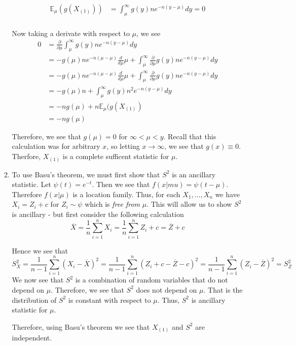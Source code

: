 \documentclass[12pt]{article}  %
\newcommand{\E}{{\mathbb{E}}}
\begin{document}
\begin{enumerate}
\begin{enumerate}
\begin{align*}
\E_{\mu}(g(X_{(1)})) &= \int_{\mu}^{\infty}g(y)ne^{-n(y-\mu)}dy  = 0\\
\end{align*}

Now taking a derivate with respect to $\mu$, we see 
\begin{align*}
0 &= \frac{\partial}{\partial \mu}\int_{\mu}^{\infty}g(y)ne^{-n(y-\mu)}dy \\
&= -g(\mu)ne^{-n(\mu-\mu)}\frac{d}{d\mu}\mu +  \int_{\mu}^{\infty}\frac{\partial}{\partial\mu}g(y)ne^{-n(y-\mu)}dy\\
&= -g(\mu)ne^{-n(\mu-\mu)}\frac{d}{d\mu}\mu +  \int_{\mu}^{\infty}\frac{\partial}{\partial\mu}g(y)ne^{-n(y-\mu)}dy\\
&= -g(\mu)n +  \int_{\mu}^{\infty}g(y)n^2e^{-n(y-\mu)}dy\\
&= -ng(\mu) + n\E_{\mu}(g(X_{(1)})\\
&= -ng(\mu)
\end{align*}

Therefore, we see that $g(\mu) = 0$ for $\infty <\mu<y$. Recall that this calculation was for arbitrary $x$, so letting $x\to\infty$, we see that $g(x)\equiv 0$. Therfore, $X_{(1)}$ is a complete sufficent statistic for $\mu$. 

\item To use Basu's theorem, we must first show that $S^2$ is an ancillary statistic. Let $\psi(t) = e^{-t}$. Then we see that $f(x|mu) = \psi(t-\mu)$. Therefore $f(x|\mu)$ is a location family. Thus, for each $X_1, \ldots, X_n$ we have $X_i = Z_i + c$ for $Z_i \sim \psi$ which is \textit{free from} $\mu$. This will allow us to show $S^2$ is ancillary - but first consider the following calculation $$\overline{X} = \frac{1}{n}\sum_{i=1}^{n}X_i = \frac{1}{n}\sum_{i=1}^{n}Z_i + c = \overline{Z} + c$$

Hence we see that $$S_X^2 = \frac{1}{n-1}\sum_{i=1}^{n}(X_i - \overline{X})^2  = \frac{1}{n-1}\sum_{i=1}^{n}(Z_i + c - \overline{Z} - c)^2= \frac{1}{n-1}\sum_{i=1}^{n}(Z_i - \overline{Z})^2=S^2_Z $$ We now see that $S^2$ is a combination of random variables that do not depend on $\mu$. Therefore, we see that $S^2$ does not depend on $\mu$. That is the distribution of $S^2$ is constant with respect to $\mu$. Thus, $S^2$ is ancillary statistic for $\mu$. 

Therefore, using Basu's theorem we see that $X_{(1)}$ and $S^2$ are independent. 
\end{enumerate}


\end{enumerate}
\end{document}
